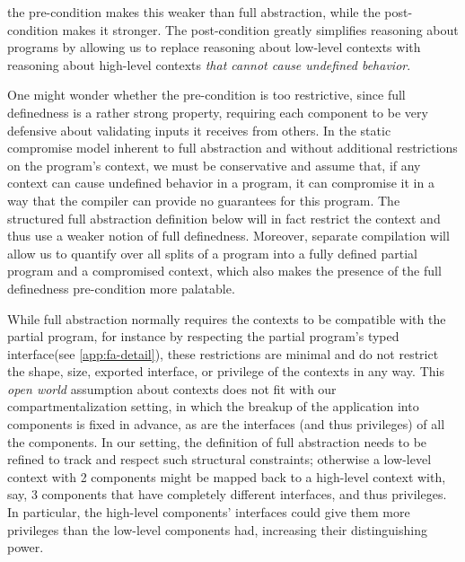 \documentclass[10pt, conference, compsocconf, letterpaper, times]{IEEEtran}
\begin{document}
the  pre-condition makes this weaker than
full abstraction, while the  post-condition makes it stronger.
The post-condition greatly simplifies reasoning about programs 
by allowing us to replace reasoning about low-level contexts with
reasoning about high-level contexts {\em that cannot cause undefined
behavior}.

One might wonder whether the
 pre-condition is too restrictive,
since full definedness is a rather strong property, requiring each 
component to be very defensive about validating inputs it receives from
others.
In the static compromise model inherent to full abstraction and
without additional restrictions on the program's context, we must 
be conservative and assume that, if any context can cause
undefined behavior in a program, it can compromise it in a way that the
compiler can provide no guarantees for this program.
The structured full abstraction definition below will in fact restrict
the context and thus use a weaker notion of full definedness.
Moreover, separate compilation will allow us to quantify over all splits of a
program into a fully defined partial program and a compromised
context, which also makes the presence of the full definedness
pre-condition more palatable.

\label{sec:prob2}









While full abstraction normally requires the contexts
to be compatible with the partial program, for instance by respecting
the partial program's typed interface\iffull (see \autoref{app:fa-detail})\fi,
these restrictions are minimal
and do not restrict the shape\ifsooner{}\fi, size,
\ifsooner{}\fi
exported interface, or privilege
of the contexts in any way.
This {\em open world} assumption about contexts does not fit with our
compartmentalization setting, in which the breakup of the
application into components is fixed in advance, as are the
interfaces (and thus privileges) of all the components.
In our setting, the definition of full abstraction needs to be refined
to track and respect such structural constraints; otherwise a
low-level context with 2 components might be mapped back to a
high-level context with, say, 3 components that have completely different
interfaces, and thus privileges.
In particular, the high-level components' interfaces could give them
more privileges than the low-level components had, 
increasing their distinguishing power.
\end{document}
